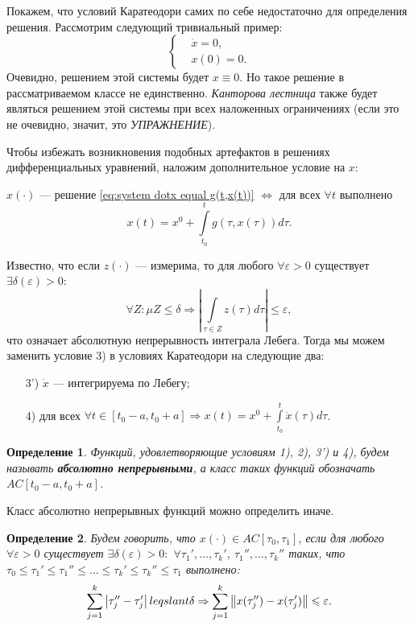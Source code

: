 \documentclass[12pt, a4paper]{article}
\theoremstyle{rusdef}
\newtheorem{define}{Определение} %
\newcommand\abs[1]{\left\lvert #1 \right\rvert} %
\newcommand{\norm}[1]{\left\lVert #1 \right\rVert} %
\begin{document}
Покажем, что условий Каратеодори самих по себе недостаточно для определения решения. Рассмотрим следующий тривиальный пример:
$$
\left\{
\begin{aligned}
& \dot{x} = 0,\\
& x(0) = 0.
\end{aligned}
\right.
$$
Очевидно, решением этой системы будет $x \equiv 0$. Но такое решение в рассматриваемом классе не единственно. \textit{Канторова лестница} также будет являться решением этой системы при всех наложенных ограничениях (если это не очевидно, значит, это \textit{УПРАЖНЕНИЕ}).

Чтобы избежать возникновения подобных артефактов в решениях дифференциальных уравнений, наложим дополнительное условие на $x$:
\begin{center}
$x(\cdot)$ --- решение \eqref{eq:system dotx equal g(t,x(t))} $\Leftrightarrow$ для всех $\forall t$ выполнено
$$
x(t) = x^0 + \int\limits_{t_0}^{t} g(\tau, x(\tau)) d\tau.
$$
\end{center}

Известно, что если $z(\cdot)$ --- измерима, то для любого $\forall \varepsilon > 0$ существует $\exists \delta(\varepsilon) > 0$:
$$
\forall Z \colon \mu{Z} \leqslant \delta \Rightarrow \abs{\int\limits_{\tau \in Z} z(\tau) d\tau} \leqslant \varepsilon,
$$
что означает абсолютную непрерывность интеграла Лебега. Тогда мы можем заменить условие 3) в условиях Каратеодори на следующие два:
\begin{enumerate}
\item[3')] $\dot{x}$ --- интегрируема по Лебегу;
\item[4)] для всех $\forall t \in [t_0 - a, t_0 + a] \Rightarrow x(t) = x^0 + \int\limits_{t_0}^{t} \dot{x}(\tau) d\tau$.
\end{enumerate}

\begin{define}
Функций, удовлетворяющие условиям 1), 2), 3') и 4), будем называть \textbf{абсолютно непрерывными}, а класс таких функций обозначать $AC[t_0 - a, t_0 + a]$.
\end{define}

Класс абсолютно непрерывных функций можно определить иначе.

\begin{define}
Будем говорить, что $x(\cdot) \in AC[\tau_0, \tau_1]$, если для любого $\forall \varepsilon > 0$ существует $\exists \delta(\varepsilon) > 0 \colon$ $\forall \tau_1', \ldots, \tau_k'$, $\tau_1'', \ldots, \tau_k''$ таких, что $\tau_0 \leqslant \tau_1' \leqslant \tau_1'' \leqslant \ldots \leqslant \tau_k' \leqslant \tau_k'' \leqslant \tau_1$ выполнено:
$$
\sum\limits_{j = 1}^{k} \abs{\tau_j'' - \tau_j'} \\leqslant \delta \Rightarrow \sum\limits_{j=1}^{k} \norm{x(\tau_j'') - x(\tau_j')} \leqslant \varepsilon.
$$
\end{define}
\end{document}
